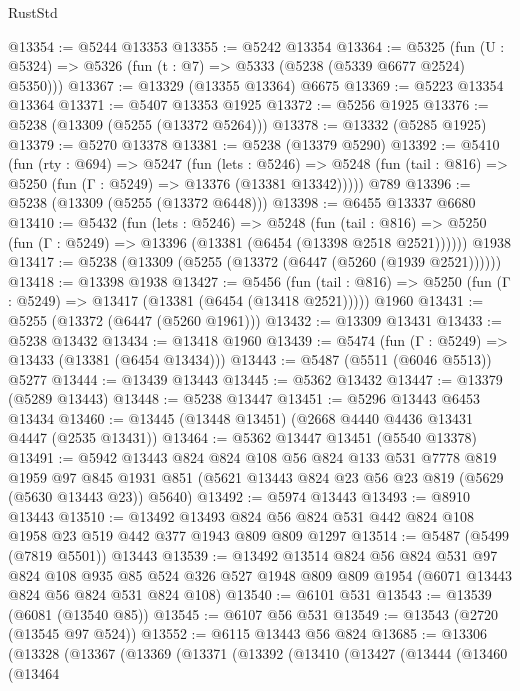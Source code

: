 \begin{lexlean}{RustStd}
\begin{coremodule}
@13354 := @5244 @13353
@13355 := @5242 @13354
@13364 := @5325 (fun (U : @5324) => @5326 (fun (t : @7) => @5333 (@5238 (@5339 @6677 @2524) @5350)))
@13367 := @13329 (@13355 @13364) @6675
@13369 := @5223 @13354 @13364
@13371 := @5407 @13353 @1925
@13372 := @5256 @1925
@13376 := @5238 (@13309 (@5255 (@13372 @5264)))
@13378 := @13332 (@5285 @1925)
@13379 := @5270 @13378
@13381 := @5238 (@13379 @5290)
@13392 := @5410
    (fun (rty : @694) =>
    @5247
      (fun (lets : @5246) =>
      @5248 (fun (tail : @816) => @5250 (fun (Γ : @5249) => @13376 (@13381 @13342)))))
    @789
@13396 := @5238 (@13309 (@5255 (@13372 @6448)))
@13398 := @6455 @13337 @6680
@13410 := @5432
    (fun (lets : @5246) =>
    @5248
      (fun (tail : @816) =>
      @5250 (fun (Γ : @5249) => @13396 (@13381 (@6454 (@13398 @2518 @2521))))))
    @1938
@13417 := @5238 (@13309 (@5255 (@13372 (@6447 (@5260 (@1939 @2521))))))
@13418 := @13398 @1938
@13427 := @5456
    (fun (tail : @816) => @5250 (fun (Γ : @5249) => @13417 (@13381 (@6454 (@13418 @2521)))))
    @1960
@13431 := @5255 (@13372 (@6447 (@5260 @1961)))
@13432 := @13309 @13431
@13433 := @5238 @13432
@13434 := @13418 @1960
@13439 := @5474 (fun (Γ : @5249) => @13433 (@13381 (@6454 @13434)))
@13443 := @5487 (@5511 (@6046 @5513)) @5277
@13444 := @13439 @13443
@13445 := @5362 @13432
@13447 := @13379 (@5289 @13443)
@13448 := @5238 @13447
@13451 := @5296 @13443 @6453 @13434
@13460 := @13445 (@13448 @13451) (@2668 @4440 @4436 @13431 @4447 (@2535 @13431))
@13464 := @5362 @13447 @13451 (@5540 @13378)
@13491 := @5942
    @13443
    @824
    @824
    @108
    @56
    @824
    @133
    @531
    @7778
    @819
    @1959
    @97
    @845
    @1931
    @851
    (@5621 @13443 @824 @23 @56 @23 @819 (@5629 (@5630 @13443 @23)) @5640)
@13492 := @5974 @13443
@13493 := @8910 @13443
@13510 := @13492
    @13493
    @824
    @56
    @824
    @531
    @442
    @824
    @108
    @1958
    @23
    @519
    @442
    @377
    @1943
    @809
    @809
    @1297
@13514 := @5487 (@5499 (@7819 @5501)) @13443
@13539 := @13492
    @13514
    @824
    @56
    @824
    @531
    @97
    @824
    @108
    @935
    @85
    @524
    @326
    @527
    @1948
    @809
    @809
    @1954
    (@6071 @13443 @824 @56 @824 @531 @824 @108)
@13540 := @6101 @531
@13543 := @13539 (@6081 (@13540 @85))
@13545 := @6107 @56 @531
@13549 := @13543 (@2720 (@13545 @97 @524))
@13552 := @6115 @13443 @56 @824
@13685 := @13306
    (@13328
      (@13367
        (@13369
          (@13371
            (@13392
              (@13410
                (@13427
                  (@13444
                    (@13460
                      (@13464

\end{coremodule}
\end{lexlean}
